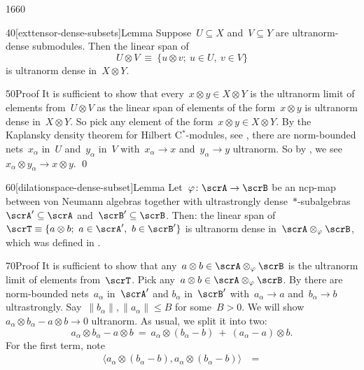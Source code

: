 \begin{parsec}{1660}
\begin{point}{40}[exttensor-dense-subsets]{Lemma}
Suppose~$U \subseteq X$ and~$V \subseteq Y$
    are ultranorm-dense submodules.
Then the linear span of
\begin{equation*}
    U \otimes V \ \equiv\  \{ u \otimes v;\  u \in U,\ v \in V\}
\end{equation*}
is ultranorm dense in~$X \otimes Y$.
\begin{point}{50}{Proof}%
It is sufficient to show that every~$x \otimes y \in X \otimes Y$
    is the ultranorm limit of elements from~$U \otimes V$
    as the linear span of elements of the form~$x \otimes y$
    is ultranorm dense in~$X \otimes Y$.
So pick any element of the form~$x \otimes y \in X \otimes Y$.
By the Kaplansky density theorem for Hilbert C$^*$-modules,
 see ,
    there are norm-bounded nets~$x_\alpha$ in~$U$
    and~$y_\alpha$ in~$V$
    with~$x_\alpha \to x$ and~$y_\alpha \to y$ ultranorm.
So by ,
    we see~$x_\alpha \otimes y_\alpha \to x \otimes y$. \qed
\end{point}
\end{point}
\begin{point}{60}[dilationspace-dense-subset]{Lemma}%
Let~$\varphi \colon \scrA \to \scrB$ be an ncp-map between von Neumann algebras
    together with ultrastrongly
    dense~$*$-subalgebras~$\scrA' \subseteq \scrA$
        and~$\scrB' \subseteq \scrB$.
Then: the linear span
    of~$ \scrT  \equiv \{ a \otimes b;\ a \in \scrA', \ b\in \scrB'\}$
is ultranorm dense in~$\scrA \otimes_\varphi \scrB$,
which was defined in  .
\begin{point}{70}{Proof}%
It is sufficient to show that any~$a\otimes b \in \scrA \otimes_\varphi \scrB$
    is the ultranorm limit of elements from~$\scrT$.
    Pick any~$a\otimes b\in \scrA \otimes_\varphi \scrB$.
By 
    there are norm-bounded nets~$a_\alpha$ in~$\scrA'$ and
    $b_\alpha$ in~$\scrB'$
    with~$a_\alpha \to a$ and~$b_\alpha \to b$ ultrastrongly.
Say~$\|b_\alpha \|, \|a_\alpha\| \leq B$ for some~$B > 0$.
We will show~$a_\alpha \otimes b_\alpha - a\otimes b \to 0$ ultranorm.
As usual, we split it into two:
\begin{equation*}
a_\alpha \otimes b_\alpha - a \otimes b
\ = \ a_\alpha \otimes(b_\alpha -b )\  +\  (a_\alpha - a) \otimes b.
\end{equation*}
For the first term, note
\begin{align*}
    \langle a_\alpha \otimes (b_\alpha  - b),
    a_\alpha \otimes (b_\alpha  - b) \rangle
    & \ = \ 

\end{align*}
\end{point}
\end{point}
\end{parsec}
